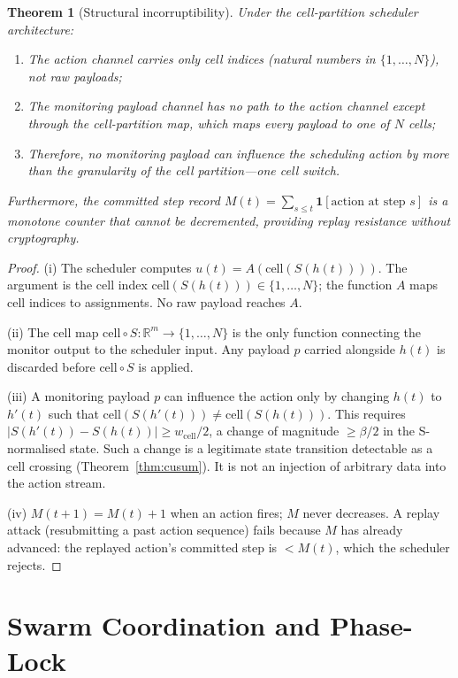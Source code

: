 \documentclass[11pt,twocolumn,a4paper]{article}
\theoremstyle{plain}
\newtheorem{theorem}{Theorem}[section]
\theoremstyle{definition}
\theoremstyle{remark}
\newcommand{\R}{\mathbb{R}}
\newcommand{\floor}{\beta}
\newcommand{\cell}{\mathrm{cell}}
\newcommand{\Scal}{S}
\begin{document}
\begin{theorem}[Structural incorruptibility]
\label{thm:incorrupt}
Under the cell-partition scheduler architecture:
\begin{enumerate}[label=(\roman*)]
\item The action channel carries only cell indices (natural numbers in $\{1, \ldots, N\}$), not raw payloads;
\item The monitoring payload channel has no path to the action channel except through the cell-partition map, which maps every payload to one of $N$ cells;
\item Therefore, no monitoring payload can influence the scheduling action by more than the granularity of the cell partition---one cell switch.
\end{enumerate}
Furthermore, the \emph{committed step record} $M(t) = \sum_{s \leq t} \mathbf{1}[\text{action at step }s]$ is a monotone counter that cannot be decremented, providing replay resistance without cryptography.
\end{theorem}

\begin{proof}
(i) The scheduler computes $u(t) = A(\cell(\Scal(h(t))))$. The argument is the cell index $\cell(\Scal(h(t))) \in \{1,\ldots,N\}$; the function $A$ maps cell indices to assignments. No raw payload reaches $A$.

(ii) The cell map $\cell \circ \Scal : \R^m \to \{1,\ldots,N\}$ is the only function connecting the monitor output to the scheduler input. Any payload $p$ carried alongside $h(t)$ is discarded before $\cell \circ \Scal$ is applied.

(iii) A monitoring payload $p$ can influence the action only by changing $h(t)$ to $h'(t)$ such that $\cell(\Scal(h'(t))) \neq \cell(\Scal(h(t)))$. This requires $|\Scal(h'(t)) - \Scal(h(t))| \geq w_{\cell}/2$, a change of magnitude $\geq \floor/2$ in the S-normalised state. Such a change is a legitimate state transition detectable as a cell crossing (Theorem~\ref{thm:cusum}). It is not an injection of arbitrary data into the action stream.

(iv) $M(t+1) = M(t) + 1$ when an action fires; $M$ never decreases. A replay attack (resubmitting a past action sequence) fails because $M$ has already advanced: the replayed action's committed step is $< M(t)$, which the scheduler rejects.
\end{proof}

\section{Swarm Coordination and Phase-Lock}
\label{sec:swarm}
\end{document}
